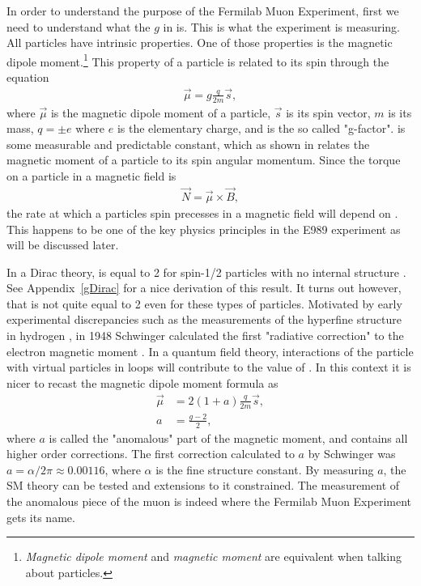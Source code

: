 In order to understand the purpose of the Fermilab Muon \gmtwo Experiment, first we need to understand what the $g$ in \gmtwo is. This is what the experiment is measuring. All particles have intrinsic properties. One of those properties is the magnetic dipole moment.\footnote{\textit{Magnetic dipole moment} and \textit{magnetic moment} are equivalent when talking about particles.} This property of a particle is related to its spin through the equation
		\begin{align}
            \vec{\mu} = g \frac{q}{2m} \vec{s},
        \label{eq:magneticmoment}
		\end{align}
where $\vec{\mu}$ is the magnetic dipole moment of a particle, $\vec{s}$ is its spin vector, $m$ is its mass, $q = \pm e$ where $e$ is the elementary charge, and \g is the so called "g-factor". \g is some measurable and predictable constant, which as shown in  relates the magnetic moment of a particle to its spin angular momentum. Since the torque on a particle in a magnetic field is 
		\begin{align}
            \vec{N} = \vec{\mu} \times \vec{B},
        \label{eq:torque}
		\end{align}
the rate at which a particles spin precesses in a magnetic field will depend on \g. This happens to be one of the key physics principles in the E989 experiment as will be discussed later.

In a Dirac theory, \g is equal to 2 for spin-1/2 particles with no internal structure \cite{Dirac}. See Appendix~\ref{gDirac} for a nice derivation of this result. It turns out however, that \g is not quite equal to 2 even for these types of particles. Motivated by early experimental discrepancies such as the measurements of the hyperfine structure in hydrogen \cite{EarlyHyperfine1}, in 1948 Schwinger calculated the first "radiative correction" to the electron magnetic moment \cite{Schwinger}. In a quantum field theory, interactions of the particle with virtual particles in loops will contribute to the value of \g. In this context it is nicer to recast the magnetic dipole moment formula as 
		\begin{equation}
		\begin{aligned}
            \vec{\mu} &= 2(1+a) \frac{q}{2m} \vec{s}, \\
            a &= \frac{g-2}{2},
        \label{eq:anamoly}
		\end{aligned}
		\end{equation}
where $a$ is called the "anomalous" part of the magnetic moment, and contains all higher order corrections. The first correction calculated to $a$ by Schwinger was $a = \alpha/2\pi \approx 0.00116$, where $\alpha$ is the fine structure constant. By measuring $a$, the SM theory can be tested and extensions to it constrained. The measurement of the anomalous piece of the muon is indeed where the Fermilab Muon \gmtwo Experiment gets its name.


